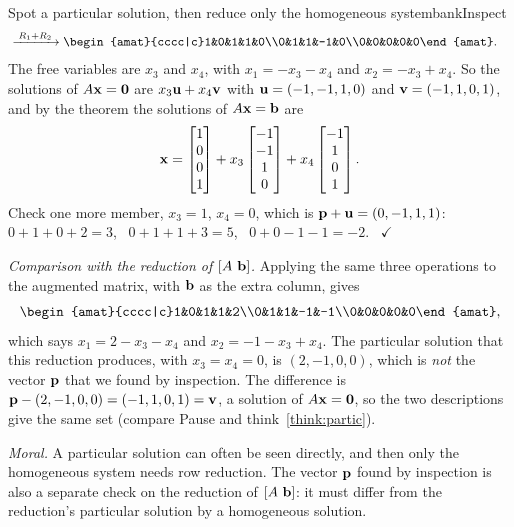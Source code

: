 \documentclass[11pt]{article}
\begin{document}
\begin{exmp}{Spot a particular solution, then reduce only the homogeneous system}{bankInspect}
\begin{align*}
&\rops{R_1+R_2}
\begin{amat}{cccc|c}1&0&1&1&0\\0&1&1&-1&0\\0&0&0&0&0\end{amat}.
\end{align*}
The free variables are $x_3$ and $x_4$, with $x_1=-x_3-x_4$ and $x_2=-x_3+x_4$. So the solutions of $A\mathbf{x}=\mathbf{0}$ are $x_3\mathbf{u}+x_4\mathbf{v}$ with $\mathbf{u}=(-1,-1,1,0)$ and $\mathbf{v}=(-1,1,0,1)$, and by the theorem the solutions of $A\mathbf{x}=\mathbf{b}$ are
\[
\mathbf{x}=\begin{bmatrix}1\\0\\0\\1\end{bmatrix}+x_3\begin{bmatrix}-1\\-1\\1\\0\end{bmatrix}+x_4\begin{bmatrix}-1\\1\\0\\1\end{bmatrix}.
\]
Check one more member, $x_3=1$, $x_4=0$, which is $\mathbf{p}+\mathbf{u}=(0,-1,1,1)$: \ $0+1+0+2=3$, \ $0+1+1+3=5$, \ $0+0-1-1=-2$. \ $\checkmark$

\emph{Comparison with the reduction of $[A\ \bv{b}]$.} Applying the same three operations to the augmented matrix, with $\mathbf{b}$ as the extra column, gives
\[
\begin{amat}{cccc|c}1&0&1&1&2\\0&1&1&-1&-1\\0&0&0&0&0\end{amat},
\]
which says $x_1=2-x_3-x_4$ and $x_2=-1-x_3+x_4$. The particular solution that this reduction produces, with $x_3=x_4=0$, is $(2,-1,0,0)$, which is \emph{not} the vector $\mathbf{p}$ that we found by inspection. The difference is $\mathbf{p}-(2,-1,0,0)=(-1,1,0,1)=\mathbf{v}$, a solution of $A\mathbf{x}=\mathbf{0}$, so the two descriptions give the same set (compare Pause and think~\ref{think:partic}).

\emph{Moral.} A particular solution can often be seen directly, and then only the homogeneous system needs row reduction. The vector $\mathbf{p}$ found by inspection is also a separate check on the reduction of $[A\ \bv{b}]$: it must differ from the reduction's particular solution by a homogeneous solution.
\end{exmp}
\end{document}
